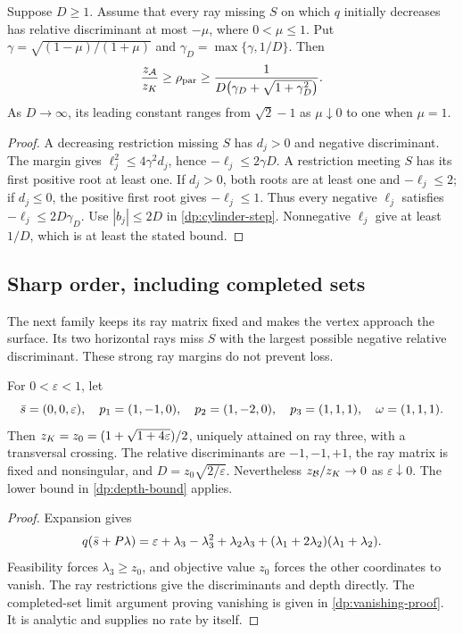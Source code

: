 \begin{corollary}\label{dp:grazing}
Suppose $D\ge1$. Assume that every ray missing $S$ on which $q$ initially
decreases has relative discriminant at most $-\mu$, where $0<\mu\le1$.
Put $\gamma=\sqrt{(1-\mu)/(1+\mu)}$ and
$\gamma_D=\max\{\gamma,1/D\}$. Then
\[
 \frac{z_{\mathcal A}}{z_K}\ge\rho_{\mathrm{par}}\ge
 \frac{1}{D\bigl(\gamma_D+\sqrt{1+\gamma_D^2}\bigr)}.
\]
As $D\to\infty$, its leading constant ranges from $\sqrt2-1$ as
$\mu\downarrow0$ to one when $\mu=1$.
\end{corollary}

\begin{proof}
A decreasing restriction missing $S$ has $d_j>0$ and negative
discriminant. The margin gives $\ell_j^2\le4\gamma^2d_j$, hence
$-\ell_j\le2\gamma D$. A restriction meeting $S$ has its first positive
root at least one. If $d_j>0$, both roots are at least one and
$-\ell_j\le2$; if $d_j\le0$, the positive first root gives $-\ell_j\le1$.
Thus every negative $\ell_j$ satisfies $-\ell_j\le2D\gamma_D$.
Use $|b_j|\le2D$ in \cref{dp:cylinder-step}. Nonnegative $\ell_j$ give
at least $1/D$, which is at least the stated bound.
\end{proof}

\subsection{Sharp order, including completed sets}

The next family keeps its ray matrix fixed and makes the vertex approach the
surface. Its two horizontal rays miss $S$ with the largest possible negative
relative discriminant. These strong ray margins do not prevent loss.

\begin{proposition}\label{dp:vanishing}
For $0<\varepsilon<1$, let
\[
 \bar s=(0,0,\varepsilon),\quad
 p_1=(1,-1,0),\quad p_2=(1,-2,0),\quad p_3=(1,1,1),\quad\omega=(1,1,1).
\]
Then $z_K=z_0=(1+\sqrt{1+4\varepsilon})/2$, uniquely attained on ray
three, with a transversal crossing. The relative discriminants are
$-1,-1,+1$, the ray matrix is fixed and nonsingular, and
$D=z_0\sqrt{2/\varepsilon}$. Nevertheless $z_{\mathcal B}/z_K\to0$ as
$\varepsilon\downarrow0$. The lower bound in \cref{dp:depth-bound} applies.
\end{proposition}

\begin{proof}
Expansion gives
\[
 q(\bar s+P\lambda)=\varepsilon+\lambda_3-\lambda_3^2+
 \lambda_2\lambda_3+(\lambda_1+2\lambda_2)(\lambda_1+\lambda_2).
\]
Feasibility forces $\lambda_3\ge z_0$, and objective value $z_0$ forces
the other coordinates to vanish. The ray restrictions give the discriminants
and depth directly. The completed-set limit argument proving vanishing is
given in \cref{dp:vanishing-proof}. It is analytic and supplies no rate by
itself.
\end{proof}

